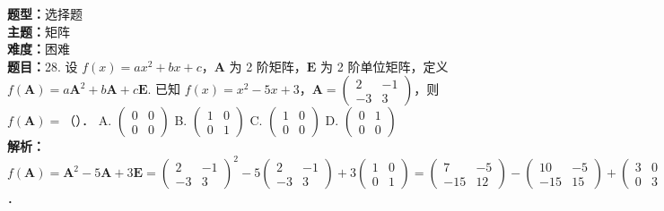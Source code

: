 \documentclass{ctexart}
\newenvironment{question}[5]{%
	\noindent\textbf{题型：}#1\\
	\textbf{主题：}#2\\
	\textbf{难度：}#3\\
	\textbf{题目：}#4\\
	\textbf{解析：}#5\\
	\vspace{1em}
}{}
\begin{document}
	\begin{question}
		{选择题}
		{矩阵}
		{困难}
		{28. 设 \(f(x)=a x^2+b x+c\)，\(\mathbf{A}\) 为 2 阶矩阵，\(\mathbf{E}\) 为 2 阶单位矩阵，定义 \(f(\mathbf{A})=a \mathbf{A}^2+b \mathbf{A}+c \mathbf{E}\). 已知 \(f(x)=x^2-5 x+3\)，\(\mathbf{A}=\left(\begin{array}{cc}2 & -1 \\ -3 & 3\end{array}\right)\)，则 \(f(\mathbf{A})=\)（）．
			A. \(\left(\begin{array}{ll}0 & 0 \\ 0 & 0\end{array}\right)\)
			B. \(\left(\begin{array}{ll}1 & 0 \\ 0 & 1\end{array}\right)\)
			C. \(\left(\begin{array}{ll}1 & 0 \\ 0 & 0\end{array}\right)\)
			D. \(\left(\begin{array}{ll}0 & 1 \\ 0 & 0\end{array}\right)\)}
		{\(f(\mathbf{A})=\mathbf{A}^2-5 \mathbf{A}+3 \mathbf{E}=\left(\begin{array}{cc}2 & -1 \\ -3 & 3\end{array}\right)^2-5\left(\begin{array}{cc}2 & -1 \\ -3 & 3\end{array}\right)+3\left(\begin{array}{ll}1 & 0 \\ 0 & 1\end{array}\right)=\left(\begin{array}{cc}7 & -5 \\ -15 & 12\end{array}\right)-\left(\begin{array}{cc}10 & -5 \\ -15 & 15\end{array}\right)+\left(\begin{array}{ll}3 & 0 \\ 0 & 3\end{array}\right)=\left(\begin{array}{ll}0 & 0 \\ 0 & 0\end{array}\right)\)．}
	\end{question}
	
\end{document}
